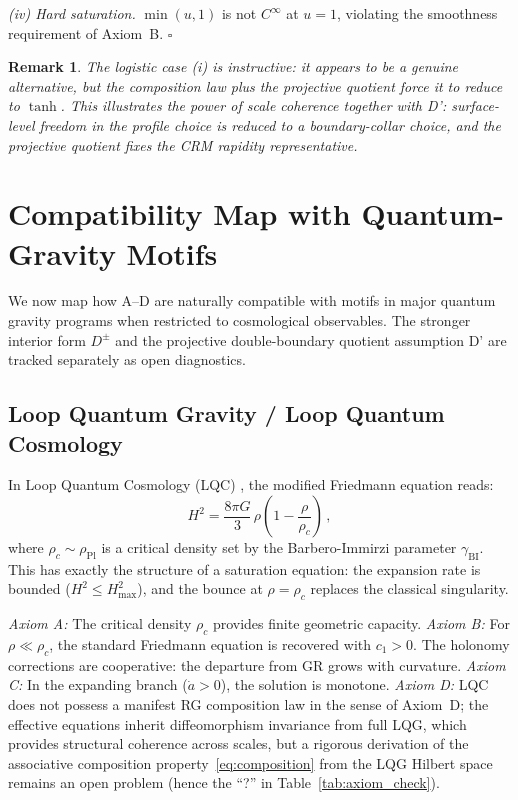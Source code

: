 \documentclass[aps,prd,twocolumn,superscriptaddress,nofootinbib]{revtex4-2}
\newtheorem{remark}{Remark}
\begin{document}
\textit{(iv) Hard saturation.} $\min(u, 1)$ is not $C^\infty$ at $u = 1$, violating the smoothness requirement of Axiom~B. \hfill $\square$

\begin{remark}
The logistic case (i) is instructive: it appears to be a genuine alternative, but the composition law plus the projective quotient force it to reduce to $\tanh$. This illustrates the power of scale coherence together with D': surface-level freedom in the profile choice is reduced to a boundary-collar choice, and the projective quotient fixes the CRM rapidity representative.
\end{remark}


\section{Compatibility Map with Quantum-Gravity Motifs}
\label{sec:qg}

We now map how A--D are naturally compatible with motifs in major quantum gravity programs when restricted to cosmological observables. The stronger interior form $D^\pm$ and the projective double-boundary quotient assumption D' are tracked separately as open diagnostics.

\subsection{Loop Quantum Gravity / Loop Quantum Cosmology}

In Loop Quantum Cosmology (LQC) \cite{Ashtekar2006,Bojowald2008}, the modified Friedmann equation reads:
\begin{equation}
H^2 = \frac{8\pi G}{3}\,\rho\!\left(1 - \frac{\rho}{\rho_c}\right)\,,
\label{eq:lqc_friedmann}
\end{equation}
where $\rho_c \sim \rho_{\mathrm{Pl}}$ is a critical density set by the Barbero-Immirzi parameter $\gamma_{\mathrm{BI}}$. This has exactly the structure of a saturation equation: the expansion rate is bounded ($H^2 \leq H_{\max}^2$), and the bounce at $\rho = \rho_c$ replaces the classical singularity.

\textit{Axiom A:} The critical density $\rho_c$ provides finite geometric capacity. \textit{Axiom B:} For $\rho \ll \rho_c$, the standard Friedmann equation is recovered with $c_1 > 0$. The holonomy corrections are cooperative: the departure from GR grows with curvature. \textit{Axiom C:} In the expanding branch ($\dot{a} > 0$), the solution is monotone. \textit{Axiom D:} LQC does not possess a manifest RG composition law in the sense of Axiom~D; the effective equations inherit diffeomorphism invariance from full LQG, which provides structural coherence across scales, but a rigorous derivation of the associative composition property~\eqref{eq:composition} from the LQG Hilbert space remains an open problem (hence the ``?'' in Table~\ref{tab:axiom_check}).
\end{document}
